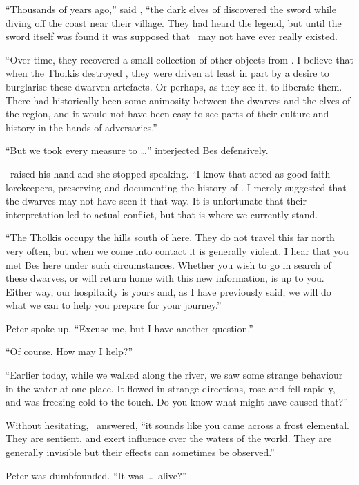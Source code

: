 ``Thousands of years ago,'' said \arilor, ``the dark elves of \yedmurdim discovered the sword while diving off the coast near their village.  They had heard the legend, but until the sword itself was found it was supposed that \atmudarant\ may not have ever really existed.

``Over time, they recovered a small collection of other objects from \atmudarant.  I believe that when the Tholkis destroyed \yedmurdim, they were driven at least in part by a desire to burglarise these dwarven artefacts.  Or perhaps, as they see it, to liberate them.  There had historically been some animosity between the dwarves and the elves of the region, and it would not have been easy to see parts of their culture and history in the hands of adversaries.''

``But we took every measure to \ldots'' interjected Bes defensively.

\arilor\ raised his hand and she stopped speaking.  ``I know that \yedmurdim acted as good-faith lorekeepers, preserving and documenting the history of \atmudarant.  I merely suggested that the dwarves may not have seen it that way.  It is unfortunate that their interpretation led to actual conflict, but that is where we currently stand.

``The Tholkis occupy the hills south of here.  They do not travel this far north very often, but when we come into contact it is generally violent.  I hear that you met Bes here under such circumstances.  Whether you wish to go in search of these dwarves, or will return home with this new information, is up to you.  Either way, our hospitality is yours and, as I have previously said, we will do what we can to help you prepare for your journey.''

Peter spoke up.  ``Excuse me, but I have another question.''

``Of course.  How may I help?''

``Earlier today, while we walked along the river, we saw some strange behaviour in the water at one place.  It flowed in strange directions, rose and fell rapidly, and was freezing cold to the touch.  Do you know what might have caused that?''

Without hesitating, \arilor\ answered, ``it sounds like you came across a frost elemental.  They are sentient, and exert influence over the waters of the world.  They are generally invisible but their effects can sometimes be observed.''

Peter was dumbfounded.  ``It was \ldots\ alive?''

